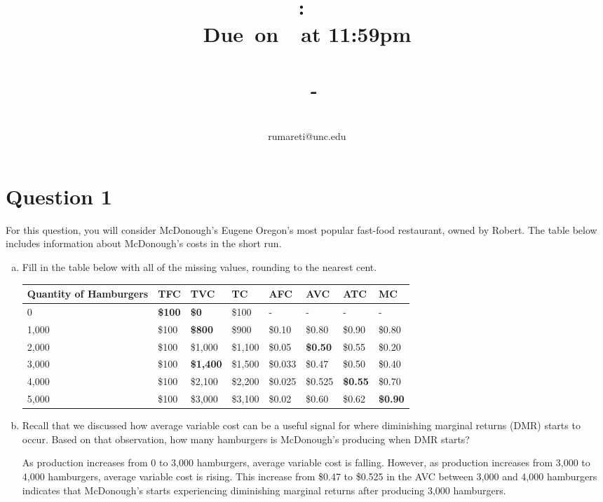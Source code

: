 \documentclass{article}
\title{
    \vspace{2in}
    \textmd{\textbf{\hmwkClass:\ \hmwkTitle}}\\
    \normalsize\vspace{0.1in}\small{\textbf{Due\ on\ \hmwkDueDate\ at 11:59pm}}\\
    \normalsize\text{Tuesday/Thursday 3:30-4:45, Genome Sciences 100}\\
    \vspace{0.1in}\large{\textit{\hmwkClassInstructor\ - \hmwkClassTime}}
    \vspace{3in}
}
\author{\hmwkAuthorName\\\small{rumareti@unc.edu}}
\date{}
\newcommand{\question}[1]{\pagebreak\section{Question #1}}
\begin{document}
\maketitle

\question{1}

For this question, you will consider McDonough's Eugene Oregon's most popular fast-food restaurant, owned by Robert. The table below includes information about McDonough's costs in the short run.

\begin{enumerate}[(a)]
    \item Fill in the table below with all of the missing values, rounding to the nearest cent.
    
    \begin{table}[h]
        \centering
        \begin{tabular}{l|l|l|l|l|l|l|l}
        
        \textbf{Quantity of Hamburgers} & TFC & TVC & TC & AFC & AVC & ATC & MC \\ \hline \hline
        0 & \textbf{\$100} & \textbf{\$0} & \$100 & - & - & - & - \\ \hline
        1,000 & \$100 & \textbf{\$800} & \$900 & \$0.10 & \$0.80 & \$0.90 & \$0.80 \\ \hline
        2,000 & \$100 & \$1,000 & \$1,100 & \$0.05 & \textbf{\$0.50} & \$0.55 & \$0.20 \\ \hline
        3,000 & \$100 & \textbf{\$1,400} & \$1,500 & \$0.033 & \$0.47 & \$0.50 & \$0.40 \\ \hline
        4,000 & \$100 & \$2,100 & \$2,200 & \$0.025 & \$0.525 & \textbf{\$0.55} & \$0.70 \\ \hline
        5,000 & \$100 & \$3,000 & \$3,100 & \$0.02 & \$0.60 & \$0.62 & \textbf{\$0.90} \\ \hline
        \end{tabular}
    \end{table}

    \item Recall that we discussed how average variable cost can be a useful signal for where diminishing marginal returns (DMR) starts to occur. Based on that observation, how many hamburgers is McDonough's producing when DMR starts?
    
    As production increases from 0 to 3,000 hamburgers, average variable cost is falling. However, as production increases from 3,000 to 4,000 hamburgers, average variable cost is rising. This increase from \$0.47 to \$0.525 in the AVC between 3,000 and 4,000 hamburgers indicates that McDonough's starts experiencing diminishing marginal returns after producing 3,000 hamburgers.


\end{enumerate}
\end{document}
